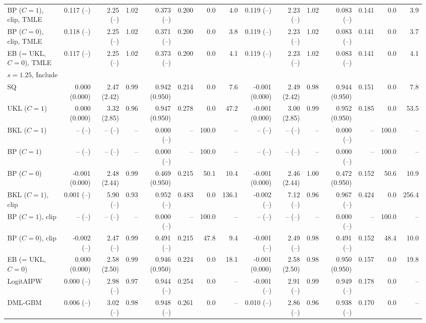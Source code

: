 \begin{tabular}{lrrrrrrrrrrrrrr}
BP ($C=1$), clip, TMLE & 0.117 (--) & 2.25 (--) & 1.02 & 0.373 (--) & 0.200 & 0.0 & 4.0 & 0.119 (--) & 2.23 (--) & 1.02 & 0.083 (--) & 0.141 & 0.0 & 3.9 \\
BP ($C=0$), clip, TMLE & 0.118 (--) & 2.25 (--) & 1.02 & 0.371 (--) & 0.200 & 0.0 & 3.8 & 0.119 (--) & 2.23 (--) & 1.02 & 0.083 (--) & 0.141 & 0.0 & 3.7 \\
EB (= UKL, $C=0$), TMLE & 0.117 (--) & 2.25 (--) & 1.02 & 0.373 (--) & 0.200 & 0.0 & 4.1 & 0.119 (--) & 2.23 (--) & 1.02 & 0.083 (--) & 0.141 & 0.0 & 4.1 \\
\multicolumn{15}{l}{$s=1.25$, Include} \\
SQ & 0.000 (0.000) & 2.47 (2.42) & 0.99 & 0.942 (0.950) & 0.214 & 0.0 & 7.6 & -0.001 (0.000) & 2.49 (2.42) & 0.98 & 0.944 (0.950) & 0.151 & 0.0 & 7.8 \\
UKL ($C=1$) & 0.000 (0.000) & 3.32 (2.85) & 0.96 & 0.947 (0.950) & 0.278 & 0.0 & 47.2 & -0.001 (0.000) & 3.00 (2.85) & 0.99 & 0.952 (0.950) & 0.185 & 0.0 & 53.5 \\
BKL ($C=1$) & -- (--) & -- (--) & -- & 0.000 (--) & -- & 100.0 & -- & -- (--) & -- (--) & -- & 0.000 (--) & -- & 100.0 & -- \\
BP ($C=1$) & -- (--) & -- (--) & -- & 0.000 (--) & -- & 100.0 & -- & -- (--) & -- (--) & -- & 0.000 (--) & -- & 100.0 & -- \\
BP ($C=0$) & -0.001 (0.000) & 2.48 (2.44) & 0.99 & 0.469 (0.950) & 0.215 & 50.1 & 10.4 & -0.001 (0.000) & 2.46 (2.44) & 1.00 & 0.472 (0.950) & 0.152 & 50.6 & 10.9 \\
BKL ($C=1$), clip & 0.001 (--) & 5.90 (--) & 0.93 & 0.952 (--) & 0.483 & 0.0 & 136.1 & -0.002 (--) & 7.12 (--) & 0.96 & 0.967 (--) & 0.424 & 0.0 & 256.4 \\
BP ($C=1$), clip & -- (--) & -- (--) & -- & 0.000 (--) & -- & 100.0 & -- & -- (--) & -- (--) & -- & 0.000 (--) & -- & 100.0 & -- \\
BP ($C=0$), clip & -0.002 (--) & 2.47 (--) & 0.99 & 0.491 (--) & 0.215 & 47.8 & 9.4 & -0.001 (--) & 2.49 (--) & 0.98 & 0.491 (--) & 0.152 & 48.4 & 10.0 \\
EB (= UKL, $C=0$) & 0.000 (0.000) & 2.58 (2.50) & 0.99 & 0.946 (0.950) & 0.224 & 0.0 & 18.1 & -0.001 (0.000) & 2.58 (2.50) & 0.98 & 0.950 (0.950) & 0.157 & 0.0 & 19.8 \\
LogitAIPW & 0.000 (--) & 2.98 (--) & 0.97 & 0.944 (--) & 0.254 & 0.0 & -- & -0.001 (--) & 2.91 (--) & 0.99 & 0.949 (--) & 0.178 & 0.0 & -- \\
DML-GBM & 0.006 (--) & 3.02 (--) & 0.98 & 0.948 (--) & 0.261 & 0.0 & -- & 0.010 (--) & 2.86 (--) & 0.96 & 0.938 (--) & 0.170 & 0.0 & -- \\

\end{tabular}
